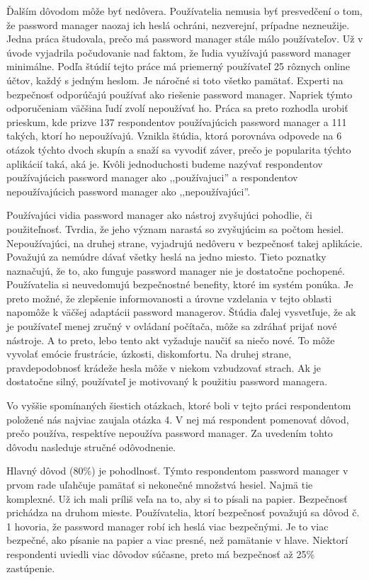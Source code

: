 Ďalším dôvodom môže byť nedôvera. Používatelia nemusia byť presvedčení o tom, že password manager naozaj ich heslá ochráni, nezverejní, prípadne nezneužije. Jedna práca \cite{survey3} študovala, prečo má password manager stále málo používateľov. Už v úvode vyjadrila počudovanie nad faktom, že ľudia využívajú password manager minimálne. Podľa štúdií tejto práce má priemerný používateľ 25 rôznych online účtov, každý s jedným heslom. Je náročné si toto všetko pamätať. Experti na bezpečnosť odporúčajú používať ako riešenie password manager. Napriek týmto odporučeniam väčšina ľudí zvolí nepoužívať ho. Práca sa preto rozhodla urobiť prieskum, kde prizve 137 respondentov používajúcich password manager a 111 takých, ktorí ho nepoužívajú. Vznikla štúdia, ktorá porovnáva odpovede na 6 otázok týchto dvoch skupín a snaží sa vyvodiť záver, prečo je popularita týchto aplikácií taká, aká je. Kvôli jednoduchosti budeme nazývať respondentov používajúcich password manager ako ,,používajuci'' a respondentov nepoužívajúcich password manager ako ,,nepoužívajúci''.

Používajúci vidia password manager ako nástroj zvyšujúci pohodlie, či použiteľnosť. Tvrdia, že jeho význam narastá so zvyšujúcim sa počtom hesiel. Nepoužívajúci, na druhej strane, vyjadrujú nedôveru v bezpečnosť takej aplikácie. Považujú za nemúdre dávať všetky heslá na jedno miesto. Tieto poznatky naznačujú, že to, ako funguje password manager nie je dostatočne pochopené. Používatelia si neuvedomujú bezpečnostné benefity, ktoré im systém ponúka. Je preto možné, že zlepšenie informovanosti a úrovne vzdelania v tejto oblasti napomôže k väčšej adaptácii password managerov. Štúdia ďalej vysvetľuje, že ak je používateľ menej zručný v ovládaní počítača, môže sa zdráhať prijať nové nástroje. A to preto, lebo tento akt vyžaduje naučiť sa niečo nové. To môže vyvolať emócie frustrácie, úzkosti, diskomfortu. Na druhej strane, pravdepodobnosť krádeže hesla môže v niekom vzbudzovať strach. Ak je dostatočne silný, používateľ je motivovaný k použitiu password managera.

Vo vyššie spomínaných šiestich otázkach, ktoré boli v tejto práci respondentom položené nás najviac zaujala otázka 4. V nej má respondent pomenovať dôvod, prečo používa, respektíve nepoužíva password manager. Za uvedením tohto dôvodu nasleduje stručné odôvodnenie.

Hlavný dôvod (80\%) je pohodlnosť. Týmto respondentom password manager v prvom rade uľahčuje pamätať si nekonečné množstvá hesiel. Najmä tie komplexné. Už ich mali príliš veľa na to, aby si to písali na papier. Bezpečnosť prichádza na druhom mieste. Používatelia, ktorí bezpečnosť považujú sa dôvod č. 1 hovoria, že password manager robí ich heslá viac bezpečnými. Je to viac bezpečné, ako písanie na papier a viac presné, než pamätanie v hlave. Niektorí respondenti uviedli viac dôvodov súčasne, preto má bezpečnosť až 25\% zastúpenie.


